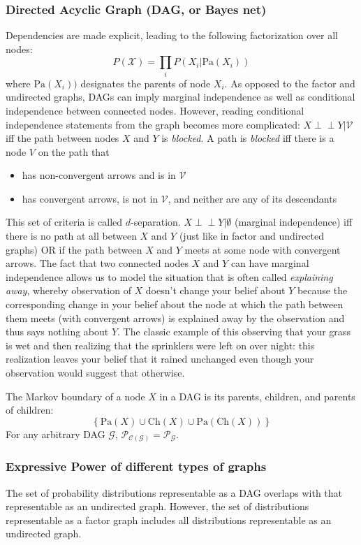 \documentclass[a4paper]{article}
\begin{document}
\subsubsection{Directed Acyclic Graph (DAG, or Bayes net)} \label{dags}
Dependencies are made explicit, leading to the following factorization over all nodes:
\[ P(\mathcal{X}) = \prod_i P(X_i|\textrm{Pa}(X_i)) \]
where $\textrm{Pa}(X_i))$ designates the parents of node $X_i$. As opposed to the factor and undirected graphs, DAGs can imply marginal independence as well as conditional independence between connected nodes. However, reading conditional independence statements from the graph becomes more complicated: $X \perp\!\!\!\perp Y|\mathcal{V}$ iff the path between nodes $X$ and $Y$ is \emph{blocked}. A path is \emph{blocked} iff there is a node $V$ on the path that
\begin{itemize}
\item has non-convergent arrows and is in $\mathcal{V}$
\item has convergent arrows, is not in $\mathcal{V}$, and neither are any of its descendants
\end{itemize}
This set of criteria is called $d$-separation. $X \perp\!\!\!\perp Y|\emptyset$ (marginal independence) iff there is no path at all between $X$ and $Y$ (just like in factor and undirected graphs) OR if the path between $X$ and $Y$ meets at some node with convergent arrows. The fact that two connected nodes $X$ and $Y$ can have marginal independence allows us to model the situation that is often called \emph{explaining away}, whereby observation of $X$ doesn't change your belief about $Y$ because the corresponding change in your belief about the node at which the path between them meets (with convergent arrows) is explained away by the observation and thus says nothing about $Y$. The classic example of this observing that your grass is wet and then realizing that the sprinklers were left on over night: this realization leaves your belief that it rained unchanged even though your observation would suggest that otherwise.

The Markov boundary of a node $X$ in a DAG is its parents, children, and parents of children:
\[ \left\{\textrm{Pa}(X) \cup \textrm{Ch}(X) \cup \textrm{Pa}(\textrm{Ch}(X))\right\} \]
For any arbitrary DAG $\mathcal{G}$, $\mathcal{P}_{\mathcal{C}(\mathcal{G})} = \mathcal{P}_\mathcal{G}$.

\subsubsection{Expressive Power of different types of graphs}
The set of probability distributions representable as a DAG overlaps with that representable as an undirected graph. However, the set of distributions representable as a factor graph includes all distributions representable as an undirected graph.
\end{document}

